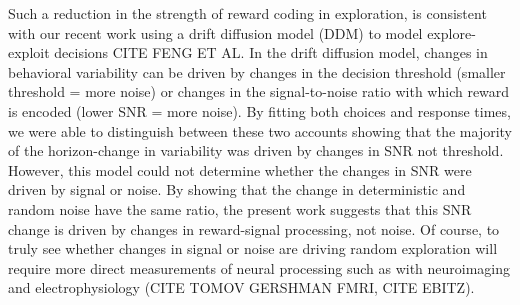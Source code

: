 \documentclass[12pt]{article}
\begin{document}
{Such a reduction in the strength of reward coding in exploration, is consistent with our recent work using a drift diffusion model (DDM) to model explore-exploit decisions CITE FENG ET AL. In the drift diffusion model, changes in behavioral variability can be driven by changes in the decision threshold (smaller threshold = more noise) or changes in the signal-to-noise ratio with which reward is encoded (lower SNR = more noise). By fitting both choices and response times, we were able to distinguish between these two accounts showing that the majority of the horizon-change in variability was driven by changes in SNR not threshold.  However, this model could not determine whether the changes in SNR were driven by signal or noise. By showing that the change in deterministic and random noise have the same ratio, the present work suggests that this SNR change is driven by changes in reward-signal processing, not noise. Of course, to truly see whether changes in signal or noise are driving random exploration will require more direct measurements of neural processing such as with neuroimaging and electrophysiology (CITE TOMOV GERSHMAN FMRI, CITE EBITZ).







}
\end{document}
